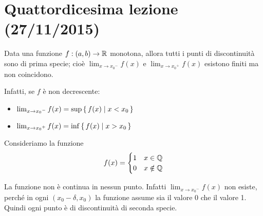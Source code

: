 \chapter{Quattordicesima lezione (27/11/2015)}

\begin{remark}
Data una funzione $f: (a, b) \to \mathbb R$ monotona, allora tutti i punti di discontinuità sono di prima specie; cioè $\lim_{x \to {x_0}^-} f(x)$ e $\lim_{x \to {x_0}^+} f(x)$ esistono finiti ma non coincidono.
\end{remark}
Infatti, se $f$ è non decrescente:
\begin{itemize}
\item $\lim_{x \to {x_0}^-} f(x) = \sup \set{f(x) | x < x_0}$
\item $\lim_{x \to {x_0}^+} f(x) = \inf \set{f(x) | x > x_0}$
\end{itemize}
\begin{center}
\end{center}

\begin{example}
Consideriamo la funzione
\begin{equation*}
f(x) = \begin{cases}
1 & x \in \mathbb Q \\
0 & x \notin \mathbb Q
\end{cases}
\end{equation*}
\begin{center}
\end{center}
La funzione non è continua in nessun punto. Infatti $\lim_{x \to {x_0}^-} f(x)$ non esiste, perché in ogni $(x_0 - \delta, x_0)$ la funzione assume sia il valore 0 che il valore 1. Quindi ogni punto è di discontinuità di seconda specie.
\end{example}

